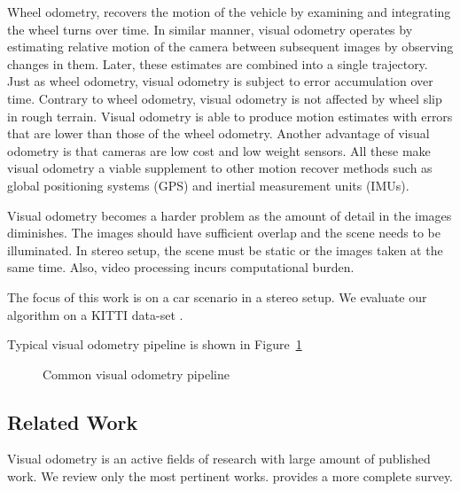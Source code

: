 \documentclass[runningheads]{llncs}
\begin{document}
Wheel odometry, recovers the motion of the vehicle by examining and
integrating the wheel turns over time.  In similar manner, visual
odometry operates by estimating relative motion of the camera between
subsequent images by observing changes in them. Later, these estimates
are combined into a single trajectory. Just as wheel odometry, visual
odometry is subject to error accumulation over time. Contrary to wheel
odometry, visual odometry is not affected by wheel slip in rough
terrain. Visual odometry is able to produce motion estimates with
errors that are lower than those of the wheel odometry. Another
advantage of visual odometry is that cameras are low cost and low
weight sensors.  All these make visual odometry a viable supplement to
other motion recover methods such as global positioning systems (GPS)
and inertial measurement units (IMUs).

Visual odometry becomes a harder problem as the amount of detail in
the images diminishes. The images should have sufficient overlap and
the scene needs to be illuminated.  In stereo setup, the scene must be
static or the images taken at the same time. Also, video processing
incurs computational burden.

The focus of this work is on a car scenario in a stereo setup. We
evaluate our algorithm on a KITTI data-set \cite{Geiger2012}.

Typical visual odometry pipeline is shown in Figure~\ref{fig:pipeline}

\begin{figure}
  \begin{center}
    
  \end{center}
  \caption{Common visual odometry pipeline}
  \label{fig:pipeline}
\end{figure}

\subsection{Related Work}
Visual odometry is an active fields of research with large amount of
published work.  We review only the most pertinent works.
\cite{Scaramuzza2011} provides a more complete survey.
\end{document}
